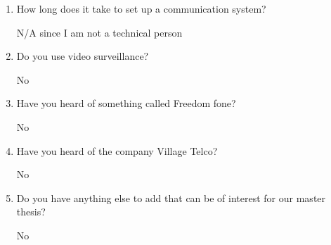\begin{enumerate}
\item How long does it take to set up a communication system?

N/A since I am not a technical person


\item Do you use video surveillance?

No

\item Have you heard of something called Freedom fone?

No

\item Have you heard of the company Village Telco?

No


\item Do you have anything else to add that can be of interest for our master thesis?

No

\end{enumerate}